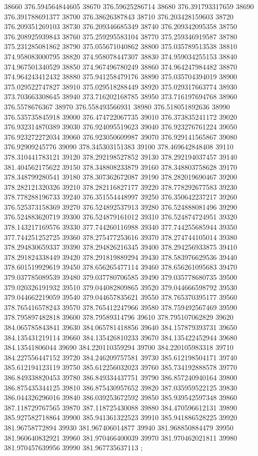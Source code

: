 {38660 376.594564844605
38670 376.59625286714
38680 376.391793317659
38690 376.391788691377
38700 376.38626387843
38710 376.203428159603
38720 376.209351269103
38730 376.209346685349
38740 376.209342095358
38750 376.208925939843
38760 375.259295583104
38770 375.259346919587
38780 375.231285081862
38790 375.055671040862
38800 375.035789513538
38810 374.958083000795
38820 374.958078447307
38830 374.959034255153
38840 374.967501340529
38850 374.967496780249
38860 374.964247984482
38870 374.964243412432
38880 375.941258479176
38890 375.035704394019
38900 375.029522747827
38910 375.029518288449
38920 375.029317663774
38930 373.703663308645
38940 373.716202168785
38950 373.716197694768
38960 376.5578676367
38970 376.558493566931
38980 376.518051892636
38990 376.535735845918
39000 376.474722067735
39010 376.373835241172
39020 376.932314870389
39030 376.924095519623
39040 376.923276761224
39050 376.923272272034
39060 376.923050609987
39070 376.929141565867
39080 376.92909245776
39090 378.345303151383
39100 378.469642848408
39110 378.310441783121
39120 378.292198527852
39130 378.292194037457
39140 381.404562175622
39150 378.348808233879
39160 378.348803758628
39170 378.348799280541
39180 378.307362672087
39190 378.282019690467
39200 378.282121320326
39210 378.282116827177
39220 378.778292677583
39230 378.778288196733
39240 376.351554448997
39250 376.350642237217
39260 376.525373158369
39270 376.524892537913
39280 376.524888081496
39290 376.524883620719
39300 376.524879161012
39310 376.524874724951
39320 378.143217169576
39330 377.744260116988
39340 377.744255685944
39350 377.744251252725
39360 378.275477253616
39370 378.274744105014
39380 378.294830659337
39390 378.294826216345
39400 378.294256933875
39410 378.291824338449
39420 378.291819889294
39430 378.583976629536
39440 378.601519929619
39450 378.656265477114
39460 378.656261095683
39470 379.037785089539
39480 379.037780706585
39490 379.035778680735
39500 379.020326191932
39510 379.044082809865
39520 379.044666598792
39530 379.044662219059
39540 379.044657835621
39550 378.765370395177
39560 378.765416578243
39570 378.765412247966
39580 378.759492567469
39590 378.795897482818
39600 378.79589314796
39610 378.795107062829
39620 384.065785843841
39630 384.065781418856
39640 384.157879393731
39650 384.135431219114
39660 384.135426810233
39670 384.135422452944
39680 384.13541806044
39690 384.220110359294
39700 384.220105983318
39710 384.227556447152
39720 384.246209757581
39730 385.612198504171
39740 385.612194123119
39750 385.612256032023
39760 385.734192888578
39770 386.849338820453
39780 386.849334437751
39790 386.857240940164
39800 386.875435344125
39810 386.875430957652
39820 387.035959522125
39830 386.044326296016
39840 386.039253672592
39850 385.939542597348
39860 387.118729767565
39870 387.118725430088
39880 384.470596612131
39890 385.927582718864
39900 385.941361322523
39910 385.941886528225
39920 381.96758772894
39930 381.967406014877
39940 381.968850884479
39950 381.960640832921
39960 381.970466400039
39970 381.970462021811
39980 381.970457639956
39990 381.967735637113
};

